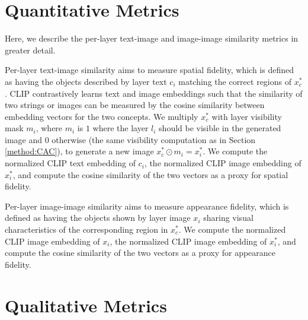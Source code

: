\section{Quantitative Metrics}

Here, we describe the per-layer text-image and image-image similarity metrics in greater detail.

Per-layer text-image similarity aims to measure spatial fidelity, which is defined as having the objects described by layer text $c_i$ matching the correct regions of $x^*_c$. CLIP \cite{radford2021learning} contrastively learns text and image embeddings such that the similarity of two strings or images can be measured by the cosine similarity between embedding vectors for the two concepts. We multiply $x^*_c$ with layer visibility mask $m_i$, where $m_i$ is $1$ where the layer $l_i$ should be visible in the generated image and $0$ otherwise (the same visibility computation as in Section \ref{method:CAC}), to generate a new image $x^*_c \odot m_i = x^*_i$. We compute the normalized CLIP text embedding of $c_i$, the normalized CLIP image embedding of $x^*_i$, and compute the cosine similarity of the two vectors as a proxy for spatial fidelity. 

Per-layer image-image similarity aims to measure appearance fidelity, which is defined as having the objects shown by layer image $x_i$ sharing visual characteristics of the corresponding region in $x^*_c$. We compute the normalized CLIP image embedding of $x_i$, the normalized CLIP image embedding of $x^*_i$, and compute the cosine similarity of the two vectors as a proxy for appearance fidelity. 

\section{Qualitative Metrics}
\label{appendix:qualitative}

